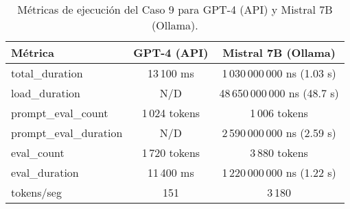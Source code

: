 
\begin{table}[h!]
\centering
\begin{tabular}{|l|c|c|}
\hline
\textbf{Métrica} & \textbf{GPT-4 (API)} & \textbf{Mistral 7B (Ollama)} \\
\hline
total\_duration & 13\,100 ms & 1\,030\,000\,000 ns (1.03 s) \\
load\_duration & N/D & 48\,650\,000\,000 ns (48.7 s) \\
prompt\_eval\_count & 1\,024 tokens & 1\,006 tokens \\
prompt\_eval\_duration & N/D & 2\,590\,000\,000 ns (2.59 s) \\
eval\_count & 1\,720 tokens & 3\,880 tokens \\
eval\_duration & 11\,400 ms & 1\,220\,000\,000 ns (1.22 s) \\
tokens/seg & 151 & 3\,180 \\
\hline
\end{tabular}
\caption{Métricas de ejecución del Caso 9 para GPT-4 (API) y Mistral 7B (Ollama).}
\end{table}
